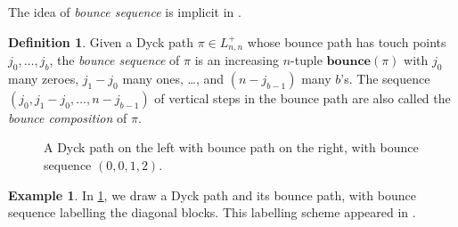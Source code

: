 \documentclass[12pt,reqno]{amsart}
\theoremstyle{definition}
\newtheorem{definition}{Definition}
\newtheorem{example}{Example}
\newcommand{\bbounce}{\mathbf{bounce}}
\begin{document}
The idea of \emph{bounce sequence} is implicit in \cite{MR3787405}.
\begin{definition}
Given a Dyck path $\pi \in L_{n,n}^+$ whose bounce path has touch points $j_0,\dots,j_{b}$, the \emph{bounce sequence} of $\pi$ is an increasing $n$-tuple $\bbounce(\pi)$ with $j_0$ many zeroes, $j_1-j_0$ many ones, \dots, and $(n-j_{b-1})$ many $b$'s.
The sequence $(j_0, j_1 - j_0, \dots, n-j_{b-1})$ of vertical steps in the bounce path are also called the \emph{bounce composition} of $\pi$.
\end{definition}

\begin{figure}
\hspace*{1cm}
\caption{A Dyck path on the left with bounce path on the right, with bounce sequence $(0,0,1,2)$.}
\label{fig:bounce0012}
\end{figure}

\begin{example}
In \cref{fig:bounce0012}, we draw a Dyck path and its bounce path, with bounce sequence labelling the diagonal blocks. This labelling scheme appeared in \cite{MR3787405}.
\end{example}
\end{document}
